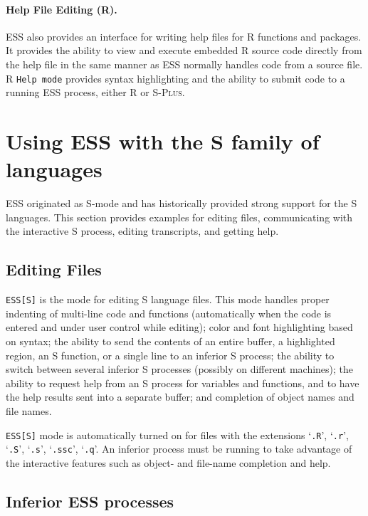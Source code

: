 \documentclass{article}
\newcommand*{\Splus}{\textsc{S-Plus}}
\newcommand{\stexttt}[1]{{\small\texttt{#1}}}
\newcommand{\file}[1]{`\stexttt{#1}'}
\begin{document}
\paragraph{Help File Editing (R).}
ESS also provides an interface for writing help files for R functions
and packages.  It provides the ability to view and execute embedded R
source code directly from the help file in the same manner as ESS
normally handles code from a source file.  R \stexttt{Help mode}
provides syntax highlighting and the ability to submit code to a
running ESS process, either R or \Splus.

\section{Using ESS with the S family of languages}
\label{sec:S}

ESS originated as S-mode and has historically provided strong support
for the S languages.  This section provides examples for editing
files, communicating with the interactive S process, editing
transcripts, and getting help.

\subsection{Editing Files}
\label{sec:S:edit}

\stexttt{ESS[S]} is the mode for editing S language files.  This mode
handles proper indenting of multi-line code and functions
(automatically when the code is entered and under user control while
editing); color and font highlighting based on syntax; the ability to
send the contents of an entire buffer, a highlighted region, an S
function, or a single line to an inferior S process; the ability to
switch between several inferior S processes (possibly on different
machines); the ability to request help from an S process for variables
and functions, and to have the help results sent into a separate
buffer; and completion of object names and file names.

\stexttt{ESS[S]} mode is automatically turned on for files with the
extensions \file{.R}, \file{.r}, \file{.S}, \file{.s}, \file{.ssc},
\file{.q}.  An inferior process must be running to take advantage of
the interactive features such as object- and file-name completion and
help.

\subsection{Inferior ESS processes}
\label{sec:S:inf}
\end{document}
